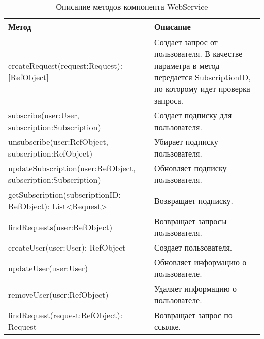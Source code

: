 \begin{table} [htbp]
   \center
   \parbox{15cm}{\caption{Описание методов компонента WebService}\label{WebServiceDescription}}
  \begin{tabular}{| p{8cm} |p{7cm} |}
  
  \hline
\textbf{Метод} & \textbf{Описание} \\
  \hline
  createRequest(request:Request): [RefObject] & Создает запрос от пользователя. В качестве параметра в метод передается SubscriptionID, по которому идет проверка запроса. \\
  
  \hline
  subscribe(user:User, subscription:Subscription)  & Создает подписку для пользователя. \\
  \hline
  unsubscribe(user:RefObject, subscription:RefObject)   & Убирает подписку пользователя. \\
  \hline
  updateSubscription(user:RefObject, subscription:Subscription)   & Обновляет подписку пользователя. \\
  \hline
  getSubscription(subscriptionID: RefObject): List<Request>    & Возвращает подписку. \\
  \hline
  findRequests(user:RefObject)     & Возвращает запросы пользователя. \\
  \hline
  createUser(user:User): RefObject     & Создает пользователя. \\
  \hline
  updateUser(user:User)     & Обновляет информацию о пользователе. \\ 
  \hline
  removeUser(user:RefObject)     & Удаляет информацию о пользователе. \\ 
  \hline
  findRequest(request:RefObject): Request     & Возвращает запрос по ссылке. \\ 
 
  \hline
\end{tabular}

\end{table}
\clearpage
